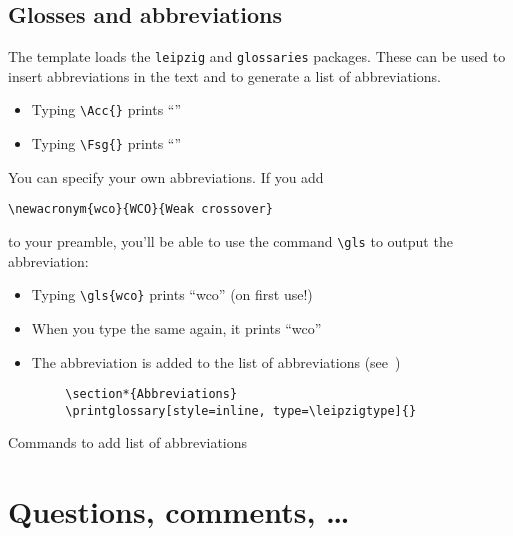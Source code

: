 \subsection{Glosses and abbreviations}\label{sub:glosses}

The template loads the \texttt{leipzig} and \texttt{glossaries} packages. These can
be used to insert abbreviations in the text and to generate a list of abbreviations.

\begin{itemize}
    \item Typing \verb+\Acc{}+ prints \enquote{\Acc}
    \item Typing \verb+\Fsg{}+ prints \enquote{\Fsg}
\end{itemize}

You can specify your own abbreviations. If you add

\begin{verbatim}
\newacronym{wco}{WCO}{Weak crossover}
\end{verbatim}

to your preamble, you'll be able to use the command \verb+\gls+ to output the
abbreviation:

\begin{itemize}
    \item Typing \verb+\gls{wco}+ prints \enquote{\gls{wco}} (on first use!)
    \item When you type the same again, it prints \enquote{\gls{wco}}
    \item The abbreviation is added to the list of abbreviations
    (see~)
\end{itemize}

\begin{listing}[ht]
    \begin{verbatim}
        \section*{Abbreviations}
        \printglossary[style=inline, type=\leipzigtype]{}
    \end{verbatim}
    \caption{Commands to add list of abbreviations}\label{lst:abbreviations}
\end{listing}

\section{Questions, comments, \dots{}}

